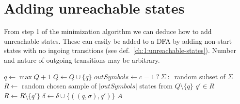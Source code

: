 \section{Adding unreachable states}

From step 1 of the minimization algorithm we can deduce how to add unreachable states. These can easily be added to a DFA by adding non-start states with no ingoing transitions (see def.~\ref{ch:1:unreachable-states}). Number and nature of outgoing transitions may be arbitrary.

\vspace{0.2cm}
\begin{algorithmic}[1]
		\State $q \gets \max Q + 1$
		\State $Q \gets Q \cup \{ q \}$
        \State $outSymbols \gets c = 1\ ?\ \Sigma\ :\ $ random subset of $\Sigma$
		\State $R \gets$ random chosen sample of $|outSymbols|$ states from $Q \setminus \{q\}$
			\State $q' \in R$
			\State $R \gets R \setminus \{q'\}$
			\State $\delta \gets \delta \cup \{ ((q, \sigma), q') \}$
		\EndFor
	\EndFor
	\State \Return $A$
	\EndFunction
\end{algorithmic}
\vspace{0.2cm}

%
